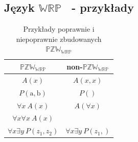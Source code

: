\documentclass[12pt]{article}
\newcommand {\PZWWRP} {\ensuremath{\mathbb{PZW_{WRP}}}}
\newcommand {\WRP} {\ensuremath{\mathbb{WRP}}}
\begin{document}
%




\subsection{Język \WRP~ - przykłady}
\begin{table}[p]
\caption{Przykłady poprawnie i niepoprawnie zbudowanych \PZWWRP}
\begin{center}
\begin{tabular}{|c|c|}
\hline
\textbf{\PZWWRP} & \textbf{non-\PZWWRP}\\
\hline
$A(x)$ & $A(x,x)$\\
\hline
$P(\textrm{a},\textrm{b})$ & $P()$\\
\hline
$\forall x~A(x)$ & $A(\forall x)$\\
\cline {1-1}
$\forall x \forall x~ A(x)$&\\
\hline
$\forall x \exists y~ P(z_{1},z_{2})$& $\forall x \exists y~ P(z_{1},)$\\
\hline
\end{tabular}
\end{center}
\label{PrzykladyPZWWRP}
\end{table}
%
\end{document}
